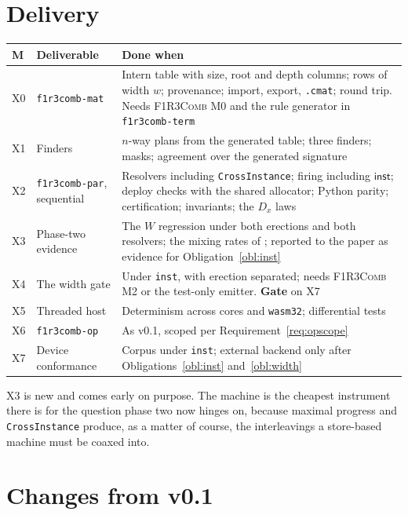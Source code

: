 \documentclass[11pt,a4paper]{article}
\newcommand{\code}[1]{\texttt{#1}}
\newcommand{\Comb}{\textsc{F1R3Comb}}
\theoremstyle{definition}
\theoremstyle{plain}
\newcommand{\inst}{\mathsf{inst}}
\begin{document}
\section{Delivery}

\begin{center}
\begin{tabularx}{\linewidth}{@{}ll>{\raggedright\arraybackslash}X@{}}
\toprule
M & Deliverable & Done when\\
\midrule
X0 & \code{f1r3comb-mat} & Intern table with size, root and depth columns;
rows of width $w$; provenance; import, export, \code{.cmat}; round trip.
Needs \Comb{} M0 and the rule generator in \code{f1r3comb-term}\\
X1 & Finders & $n$-way plans from the generated table; three finders; masks;
agreement over the generated signature\\
X2 & \code{f1r3comb-par}, sequential & Resolvers including
\code{CrossInstance}; firing including $\inst$; deploy checks with the shared
allocator; Python parity; certification; invariants; the $D_{x}$ laws\\
X3 & Phase-two evidence & The $W$ regression under both erections and both
resolvers; the mixing rates of \cite[Find.~14.1]{matnote}; reported to the
paper as evidence for Obligation~\ref{obl:inst}\\
X4 & The width gate & Under \code{inst}, with erection separated; needs
\Comb{} M2 or the test-only emitter. \textbf{Gate} on X7\\
X5 & Threaded host & Determinism across cores and \code{wasm32};
differential tests\\
X6 & \code{f1r3comb-op} & As v0.1, scoped per
Requirement~\ref{req:opscope}\\
X7 & Device conformance & Corpus under \code{inst}; external backend only
after Obligations~\ref{obl:inst} and~\ref{obl:width}\\
\bottomrule
\end{tabularx}
\end{center}

\noindent
X3 is new and comes early on purpose. The machine is the cheapest instrument
there is for the question phase two now hinges on, because maximal progress
and \code{CrossInstance} produce, as a matter of course, the interleavings a
store-based machine must be coaxed into.

\section{Changes from v0.1}\label{sec:v1delta}
\end{document}
